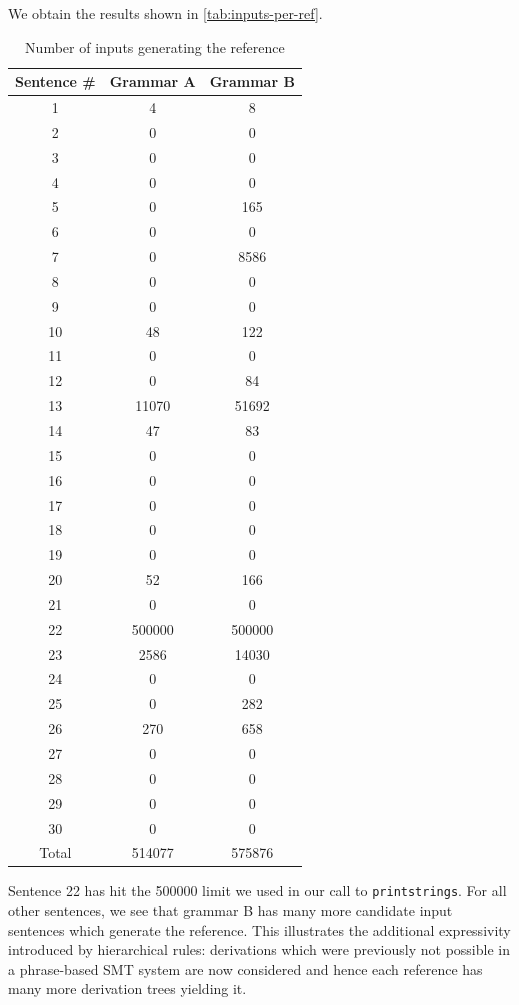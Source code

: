 \documentclass[a4paper,oneside,reqno]{amsart}
\begin{document}
\begin{enumerate}[label=\arabic*.]
    We obtain the results shown in \autoref{tab:inputs-per-ref}.
    \begin{table}[h]
      \begin{tabular}{ccc}
        \toprule
        Sentence \# & Grammar A & Grammar B \\
        \midrule
        1 & 4 & 8 \\
        2 & 0 & 0 \\
        3 & 0 & 0 \\
        4 & 0 & 0 \\
        5 & 0 & 165 \\
        6 & 0 & 0 \\
        7 & 0 & 8586 \\
        8 & 0 & 0 \\
        9 & 0 & 0 \\
        10 & 48 & 122 \\
        11 & 0 & 0 \\
        12 & 0 & 84 \\
        13 & 11070 & 51692 \\
        14 & 47 & 83 \\
        15 & 0 & 0 \\
        16 & 0 & 0 \\
        17 & 0 & 0 \\
        18 & 0 & 0 \\
        19 & 0 & 0 \\
        20 & 52 & 166 \\
        21 & 0 & 0 \\
        22 & 500000 & 500000 \\
        23 & 2586 & 14030 \\
        24 & 0 & 0 \\
        25 & 0 & 282 \\
        26 & 270 & 658 \\
        27 & 0 & 0 \\
        28 & 0 & 0 \\
        29 & 0 & 0 \\
        30 & 0 & 0 \\
        \hline
        Total & 514077 & 575876 \\
        \bottomrule
      \end{tabular}
      \caption{Number of inputs generating the reference}
      \label{tab:inputs-per-ref}
    \end{table}
    Sentence 22 has hit the 500000 limit we used in our call to
    \texttt{printstrings}.  For all other sentences, we see that grammar B has
    many more candidate input sentences which generate the reference. This
    illustrates the additional expressivity introduced by hierarchical rules:
    derivations which were previously not possible in a phrase-based SMT system
    are now considered and hence each reference has many more derivation trees
    yielding it.


\end{enumerate}
\end{document}
